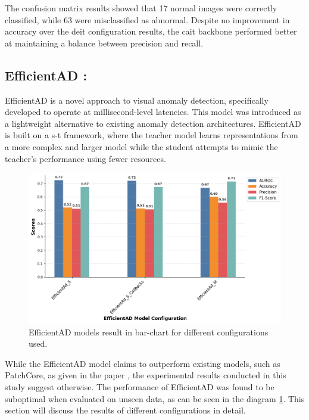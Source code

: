 The confusion matrix results showed that 17 normal images were correctly classified, while 63 were misclassified as abnormal. Despite no improvement in accuracy over the \gls{deit} configuration results, the \gls{cait} backbone performed better at maintaining a balance between precision and recall.

\subsection*{EfficientAD : }

EfficientAD is a novel approach to visual anomaly detection, specifically developed to operate at millisecond-level latencies. This model was introduced as a lightweight alternative to existing anomaly detection architectures. EfficientAD is built on a \gls{s-t} framework, where the teacher model learns representations from a more complex and larger model while the student attempts to mimic the teacher's performance using fewer resources.

\begin{figure}[ht!]
    \centering
    \includegraphics[width=1.2\linewidth]{Rohit_Master_Thesis//Images/efficientad_model_results.png}
    \caption{EfficientAD models result in bar-chart for different configurations used.}
    \label{fig:efficientad model results}
\end{figure}

While the EfficientAD model claims to outperform existing models, such as PatchCore\cite{roth2022totalrecallindustrialanomaly}, as given in the paper \cite{batzner2024efficientadaccuratevisualanomaly}, the experimental results conducted in this study suggest otherwise. The performance of EfficientAD was found to be suboptimal when evaluated on unseen data, as can be seen in the diagram \ref{fig:efficientad model results}. This section will discuss the results of different configurations in detail.

